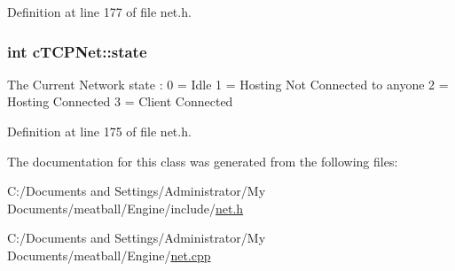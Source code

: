Definition at line 177 of file net.\-h.

\hypertarget{classc_t_c_p_net_a07e6aa8d2af28f80aeefcce1b7c416c3}{
\subsubsection[{state}]{\setlength{\rightskip}{0pt plus 5cm}int c\-T\-C\-P\-Net\-::state}}\label{classc_t_c_p_net_a07e6aa8d2af28f80aeefcce1b7c416c3}
The Current Network state \-: 0 = Idle 1 = Hosting Not Connected to anyone 2 = Hosting Connected 3 = Client Connected 

Definition at line 175 of file net.\-h.



The documentation for this class was generated from the following files\-:\begin{DoxyCompactItemize}
\item 
C\-:/\-Documents and Settings/\-Administrator/\-My Documents/meatball/\-Engine/include/\hyperlink{net_8h}{net.\-h}\item 
C\-:/\-Documents and Settings/\-Administrator/\-My Documents/meatball/\-Engine/\hyperlink{net_8cpp}{net.\-cpp}\end{DoxyCompactItemize}
